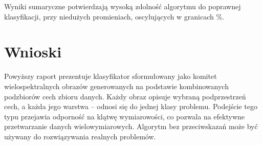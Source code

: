 \documentclass[]{article}
\begin{document}
Wyniki sumaryczne potwierdzają wysoką zdolność algorytmu do poprawnej klasyfikacji, przy niedużych promieniach, oscylujących w granicach \%.

\FloatBarrier

\section{Wnioski}

Powyższy raport prezentuje klasyfikator sformułowany jako komitet wielospektralnych obrazów generowanych na podstawie kombinowanych podzbiorów cech zbioru danych. Każdy obraz opisuje wybraną podprzestrzeń cech, a każda jego warstwa -- odnosi się do jednej klasy problemu. Podejście tego typu przejawia odporność na klątwę wymiarowości, co pozwala na efektywne przetwarzanie danych wielowymiarowych. Algorytm bez przeciwskazań może być używany do rozwiązywania realnych problemów.



\end{document}
